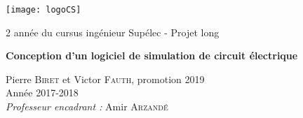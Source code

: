 \begin{titlepage}
\begin{center}

\texttt{[image: logoCS]}~\\[1cm]

\vspace{0.5cm}

{\LARGE 2\ieme{} année du cursus ingénieur Supélec - Projet long\\[0.4cm] }

{\Huge \bfseries Conception d'un logiciel de simulation de circuit électrique \\[0.4cm] }

\vspace{1.5cm}

\huge Pierre \textsc{Biret} et Victor \textsc{Fauth}, promotion 2019 \\[2cm]

\LARGE Année 2017-2018 \\[2cm]

\textit{Professeur encadrant :} Amir \textsc{Arzandé}


\end{center}
\end{titlepage}